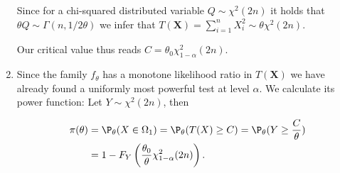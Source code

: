 \begin{solution}
\begin{enumerate}[label = (\alph*)]
  Since for a chi-squared distributed variable $Q \sim \chi^2(2n)$ it holds
  that $\theta Q \sim \Gamma(n, 1/2\theta)$ we infer that $T(\textbf{X}) = \sum_{i=1}^n X_i^2 \sim \theta \chi^2(2n)$.

  Our critical value thus reads $C = \theta_0 \chi^2_{1 - \alpha}(2n)$.

  \item Since the family $f_\theta$ has a monotone likelihood ratio in $T(\textbf{X})$ we have
  already found a uniformly most powerful test at level $\alpha$.
  We calculate its power function: Let $Y \sim \chi^2(2n)$, then

  \begin{align*}
    \pi(\theta) &= \P_\theta(X \in \Omega_1) = \P_\theta(T(X) \geq C)
    = \P_\theta(Y \geq \frac{C}{\theta}) \\
    &= 1 - F_{Y}\left(\frac{\theta_0}{\theta} \chi^2_{1 - \alpha}(2n)\right).
  \end{align*}
\end{enumerate}

\end{solution}

